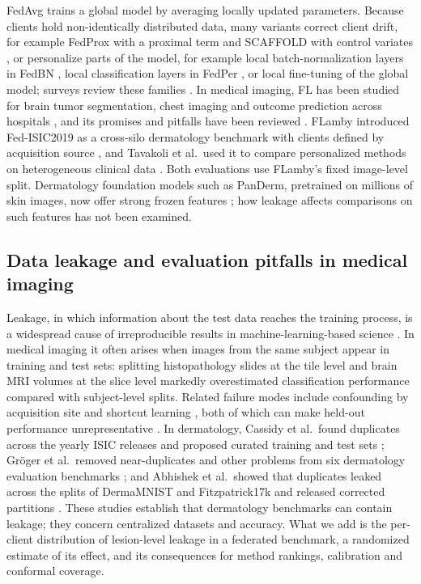 \documentclass[VANCOUVER,Times1COL]{WileyNJDv5}
\begin{document}
FedAvg \cite{mcmahan2017fedavg} trains a global model by averaging locally updated parameters. Because
clients hold non-identically distributed data, many variants correct client drift, for example FedProx
with a proximal term \cite{li2020fedprox} and SCAFFOLD with control variates
\cite{karimireddy2020scaffold}, or personalize parts of the model, for example local batch-normalization
layers in FedBN \cite{li2021fedbn}, local classification layers in FedPer \cite{arivazhagan2019fedper},
or local fine-tuning of the global model; surveys review these
families \cite{kairouz2021advances,tan2023pfl}. In medical imaging, FL has been studied for brain tumor
segmentation, chest imaging and outcome prediction across hospitals
\cite{sheller2020federated,dayan2021exam}, and its promises and pitfalls have been reviewed
\cite{rieke2020future}. FLamby introduced Fed-ISIC2019 as a cross-silo dermatology
benchmark with clients defined by acquisition source \cite{flamby2022}, and Tavakoli et al.\ used it to
compare personalized methods on heterogeneous clinical data \cite{tavakoli2024fendafl}. Both evaluations
use FLamby's fixed image-level split. Dermatology foundation models such as PanDerm, pretrained on
millions of skin images, now offer strong frozen features \cite{yan2025panderm}; how leakage affects
comparisons on such features has not been examined.

\subsection{Data leakage and evaluation pitfalls in medical imaging}

Leakage, in which information about the test data reaches the training process, is a widespread cause
of irreproducible results in machine-learning-based science \cite{kapoor2023leakage}. In medical imaging
it often arises when images from the same subject appear in training and test sets: splitting
histopathology slides at the tile level \cite{bussola2021tiles} and brain MRI volumes at the slice level
\cite{yagis2021leakage} markedly overestimated classification performance compared with subject-level
splits. Related failure modes include confounding by acquisition site \cite{zech2018confounding} and shortcut
learning \cite{degrave2021shortcuts}, both of which
can make held-out performance unrepresentative \cite{roberts2021pitfalls,varoquaux2022failures}. In
dermatology, Cassidy et al.\ found duplicates across the yearly ISIC releases and proposed curated
training and test sets \cite{cassidy2022isic}; Gr\"oger et al.\ removed near-duplicates and other
problems from six dermatology evaluation benchmarks \cite{groger2023reliable}; and Abhishek et al.\ showed
that duplicates leaked across the splits of DermaMNIST and Fitzpatrick17k and released corrected
partitions \cite{abhishek2025dermamnist}. These studies establish that dermatology benchmarks can contain
leakage; they concern centralized datasets and accuracy. What we add is the per-client distribution of
lesion-level leakage in a federated benchmark, a randomized estimate of its effect, and its consequences
for method rankings, calibration and conformal coverage.
\end{document}
